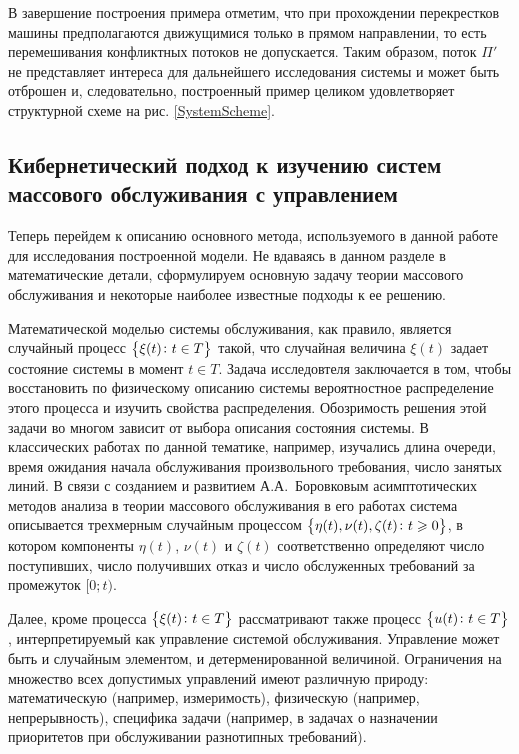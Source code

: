 \documentclass[a4paper,12pt,russian]{extarticle}
\begin{document}
В завершение построения примера отметим, что при прохождении перекрестков машины предполагаются движущимися только в прямом направлении, то есть перемешивания конфликтных потоков не допускается. Таким образом, поток $\Pi'$ не представляет интереса для дальнейшего исследования системы и может быть отброшен и, следовательно, построенный пример целиком удовлетворяет структурной схеме на рис. \ref{SystemScheme}.
 
\subsection{Кибернетический подход к изучению систем массового обслуживания с управлением}
Теперь перейдем к описанию основного метода, используемого в данной работе для исследования построенной модели. Не вдаваясь в данном разделе в математические детали, сформулируем основную задачу теории массового обслуживания и некоторые наиболее известные подходы к ее решению. 

Математической моделью системы обслуживания, как правило, является случайный процесс $\left\{\xi(t) \colon t \in T\right\}$ такой, что случайная величина $\xi(t)$ задает состояние системы в момент $t \in T$. Задача исследовтеля заключается в том, чтобы восстановить по физическому описанию системы вероятностное распределение этого процесса и изучить свойства распределения. Обозримость решения этой задачи во многом зависит от выбора описания состояния системы. В классических работах по данной тематике, например, изучались длина очереди, время ожидания начала обслуживания произвольного требования, число занятых линий. В связи с созданием и развитием А.А.~Боровковым асимптотических методов анализа в теории массового обслуживания в его работах система описывается трехмерным случайным процессом $\left\{\eta(t), \nu(t), \zeta(t)\colon t \geqslant 0\right\}$, в котором компоненты $\eta(t)$, $\nu(t)$ и $\zeta(t)$ соответственно определяют число поступивших, число получивших отказ и число обслуженных требований за промежуток $[0;t)$. 

Далее, кроме процесса $\left\{\xi(t) \colon t \in T\right\}$ рассматривают также процесс $\left\{u(t) \colon t \in T\right\}$, интерпретируемый как управление системой обслуживания. Управление может быть и случайным элементом, и детерменированной величиной. Ограничения на множество всех допустимых управлений имеют различную природу: математическую (например, измеримость), физическую (например, непрерывность), специфика задачи (например, в задачах о назначении приоритетов при обслуживании разнотипных требований).
\end{document}
